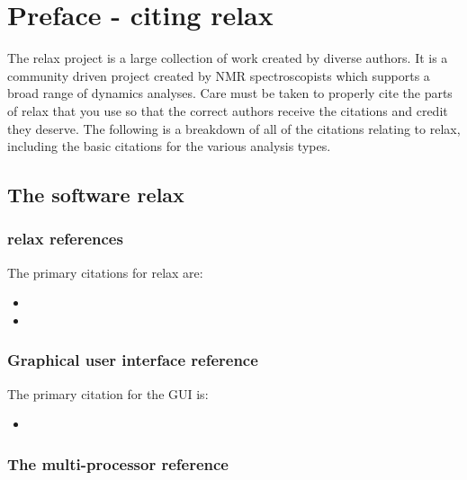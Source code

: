 
\chapter{Preface - citing relax} \label{ch: citations}

The relax project is a large collection of work created by diverse authors.
It is a community driven project created by NMR spectroscopists which supports a broad range of dynamics analyses.
Care must be taken to properly cite the parts of relax that you use so that the correct authors receive the citations and credit they deserve.
The following is a breakdown of all of the citations relating to relax, including the basic citations for the various analysis types.




\section*{The software relax}



\subsection*{relax references}

The primary citations for relax are:

\begin{itemize}
\item {}
\item {}
\end{itemize}



\subsection*{Graphical user interface reference}

The primary citation for the GUI is:

\begin{itemize}
\item {}
\end{itemize}



\subsection*{The multi-processor reference}

